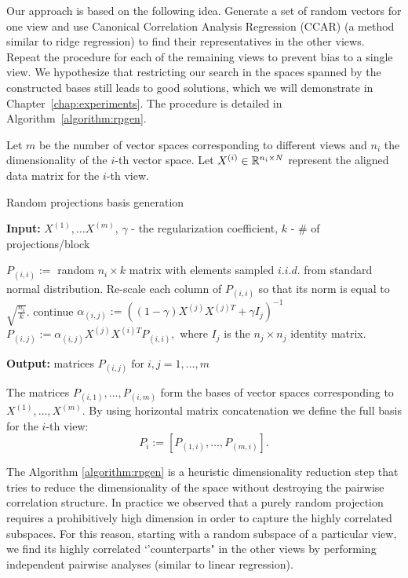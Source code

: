 Our approach is based on the following idea. Generate a set of random vectors for one view and use
Canonical Correlation Analysis Regression (CCAR)\cite{ccar} (a method similar to ridge regression)
to find their representatives in the other views. Repeat the procedure for each of the remaining views
to prevent bias to a single view. We hypothesize that restricting our search in the spaces spanned
by the constructed bases still leads to good solutions, which we will demonstrate in Chapter~\ref{chap:experiments}. 
The procedure is detailed in Algorithm~\ref{algorithm:rpgen}.

Let $m$ be the number of vector spaces corresponding to different
views and $n_i$ the dimensionality of the $i$-th vector
space. Let $X^{(i)} \in \mathbb{R}^{n_i \times N}$ represent the aligned
data matrix for the $i$-th view.


\begin{algorithm}
\caption{Random projections basis generation}
\label{algorithm:rpgen}
{\bf Input:} $X^{(1)},\ldots X^{(m)}$, $\gamma$ - the regularization coefficient, $k$ - \# of projections/block
\begin{algorithmic}
\STATE $P_{(i,i)} :=$ random $n_i \times k$ matrix with elements sampled $i.i.d.$ from standard normal distribution.
\STATE Re-scale each column of $P_{(i,i)}$ so that its norm is equal to $\sqrt{\frac{n_i}{k}}$.
 \STATE continue
\ENDIF
\STATE  $\alpha_{(i,j)} :=  \left(\left(1-\gamma\right) X^{(j)} X^{(j)T} + \gamma  I_j \right)^{-1}$
\STATE  $P_{(i,j)} :=  \alpha_{(i,j)} X^{(j)} X^{(i)T}  P_{(i,i)},$ where $I_j$ is the $n_j \times n_j$ identity matrix.
\ENDFOR
\ENDFOR
\\
\end{algorithmic}
{\bf Output:} matrices $P_{(i,j)} \;\text{for}\; i,j = 1,\ldots,m$
\end{algorithm}
\begin{sloppypar}
The matrices $P_{(i,1)}, \ldots, P_{(i,m)}$ form the bases of
vector spaces corresponding to $X^{(1)},\ldots, X^{(m)}$. By using horizontal
matrix concatenation we define the full basis for the $i$-th view:
\begin{equation}\label{eq:rp_projectors}
P_i := \left[P_{(1,i)}, \ldots, P_{(m,i)}\right].
\end{equation}
\end{sloppypar}

The Algorithm \ref{algorithm:rpgen} is a heuristic dimensionality reduction step that tries to reduce the dimensionality of the space
without destroying the pairwise correlation structure. In practice we observed that a purely random projection requires a prohibitively 
high dimension in order to capture the highly correlated subspaces. For this reason, starting with a random subspace of a particular view,
we find its highly correlated `'counterparts" in the other views by performing independent pairwise analyses (similar to linear
regression).

